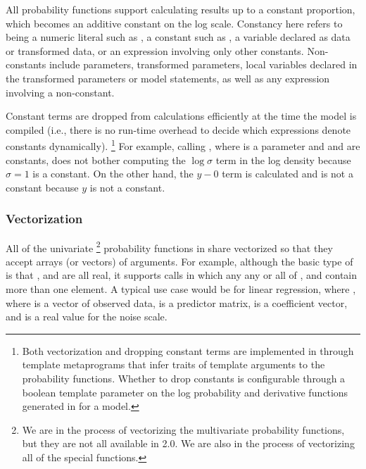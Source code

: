 \documentclass[article]{jss}
\begin{document}
All probability functions support calculating results up to a constant
proportion, which becomes an additive constant on the log scale.
Constancy here refers to being a numeric literal such as , a
constant such as , a variable declared as data or
transformed data, or an expression involving only other constants.
Non-constants include parameters, transformed parameters, local
variables declared in the transformed parameters or model statements,
as well as any expression involving a non-constant. 

Constant terms are dropped from calculations efficiently at the time
the model is compiled (i.e., there is no run-time overhead to decide
which expressions denote constants dynamically).%
%
\footnote{Both vectorization and dropping constant terms are
  implemented in  through template metaprograms that
  infer traits of template arguments to the probability functions.
  Whether to drop constants is configurable through a boolean template
  parameter on the log probability and derivative functions generated
  in  for a model.}
%
For example, calling , where  is a
parameter and  and  are constants, does not bother
computing the $\log \sigma$ term in the log density because $\sigma=1$
is a constant.  On the other hand, the $y - 0$ term is calculated and
is not a constant because $y$ is not a constant.

\subsubsection{Vectorization}

All of the univariate%
%
\footnote{We are in the process of vectorizing the multivariate
  probability functions, but they are not all available in
   2.0.  We are also in the process of vectorizing
  all of the special functions.}
%
probability functions in  share vectorized so that they
accept arrays (or vectors) of arguments.  For example, although the
basic type of  is that ,
 and  are all real, it supports calls in which
any any or all of ,  and  contain more
than one element. A typical use case would be for linear regression,
where , where  is a vector
of observed data,  is a predictor matrix,  is a
coefficient vector, and  is a real value for the noise
scale.
\end{document}
